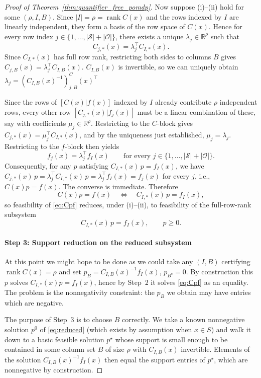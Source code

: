 \documentclass{article}
\theoremstyle{definition}
\theoremstyle{remark}
\newcommand{\rank}{\operatorname{rank}}
\begin{document}
\begin{proof}[Proof of Theorem~\ref{thm:quantifier_free_pomdp}]
Now suppose (i)--(ii) hold for some $(\rho,I,B)$. Since $|I|=\rho=\rank C(x)$ and the rows indexed by $I$ are linearly independent, they form a basis of the row space of $C(x)$. Hence for every row index $j\in\{1,\dots,|\mathcal S|+|\mathcal O|\}$, there exists a unique $\lambda_j\in\mathbb R^\rho$ such that
\[
C_{j,*}(x)=\lambda_j^\top C_{I,*}(x).
\]
Since $C_{I,*}(x)$ has full row rank, restricting both sides to columns $B$ gives $C_{j,B}(x)=\lambda_j^\top C_{I,B}(x)$.  $C_{I,B}(x)$ is invertible, so we can uniquely obtain $\lambda_j=(C_{I,B}(x)^{-1})^ C_{j,B}(x)^\top$ 

Since the rows of $[C(x) |  f(x)]$ indexed by $I$ already contribute $\rho$ independent rows, every other row $[C_{j,*}(x) |  f_j(x)]$ must be a linear combination of these, say with coefficients $\mu_j\in\mathbb R^\rho$. Restricting to the $C$-block gives $C_{j,*}(x)=\mu_j^\top C_{I,*}(x)$, and by the uniqueness just established, $\mu_j=\lambda_j$. Restricting to the $f$-block then yields
\[
f_j(x)=\lambda_j^\top f_I(x)\qquad\text{for every }j\in\{1,\dots,|\mathcal S|+|\mathcal O|\}.
\]
Consequently, for any $p$ satisfying $C_{I,*}(x)\,p=f_I(x)$, we have $C_{j,*}(x)\,p=\lambda_j^\top C_{I,*}(x)\,p=\lambda_j^\top f_I(x)=f_j(x)$ for every $j$, i.e., $C(x)p=f(x)$. The converse is immediate. Therefore
\[
C(x)p=f(x) \quad\iff\quad C_{I,*}(x)\,p = f_I(x),
\]
so feasibility of \eqref{eq:Cpf} reduces, under (i)--(ii), to feasibility of the full-row-rank subsystem
\begin{equation}
\label{eq:reduced}
C_{I,*}(x)\,p = f_I(x), \qquad p\ge 0.
\end{equation}

\paragraph{Step 3: Support reduction on the reduced subsystem}
At this point we might hope to be done as we could take any $(I,B)$ certifying $\rank C(x)=\rho$ and set $p_B=C_{I,B}(x)^{-1}f_I(x)$, $p_{B^c}=0$. By construction this $p$ solves $C_{I,*}(x)p=f_I(x)$, hence by Step~2 it solves \eqref{eq:Cpf} as an equality. The problem is the nonnegativity constraint: the $p_B$ we obtain may have entries which are negative. 

The purpose of Step~3 is to choose $B$ correctly. We take a known nonnegative solution $p^0$ of \eqref{eq:reduced} (which exists by assumption when $x\in S$) and walk it down to a basic feasible solution $p^\star$ whose support is small enough to be contained in some column set $B$ of size $\rho$ with $C_{I,B}(x)$ invertible. Elements of the solution $C_{I,B}(x)^{-1}f_I(x)$ then equal the support entries of $p^\star$, which are nonnegative by construction. 
 

\end{proof}
\end{document}
